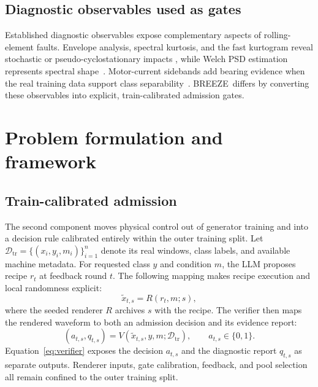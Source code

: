 \documentclass[a4paper,fleqn]{cas-sc}
\newcommand{\breeze}{BREEZE}
\begin{document}
\subsection{Diagnostic observables used as gates}

Established diagnostic observables expose complementary aspects of
rolling-element faults. Envelope analysis, spectral kurtosis, and the fast
kurtogram reveal stochastic or pseudo-cyclostationary impacts
\citep{randall2011bearing,antoni2006spectral,antoni2007kurtogram}, while Welch
PSD estimation represents spectral shape~\citep{welch1967psd}. Motor-current
sidebands add bearing evidence when the real training data support class
separability~\citep{schoen1995mcsa}. \breeze\ differs by converting these
observables into explicit, train-calibrated admission gates.

\section{Problem formulation and framework}
\label{sec:method}

\subsection{Train-calibrated admission}

The second component moves physical control out of generator training and into
a decision rule calibrated entirely within the outer training split. Let
$\mathcal{D}_{\mathrm{tr}}=\{(x_i,y_i,m_i)\}_{i=1}^{n}$ denote its real
windows, class labels, and available machine metadata. For requested class $y$
and condition $m$, the LLM proposes recipe $r_t$ at feedback round $t$. The
following mapping makes recipe execution and local randomness explicit:
\begin{equation}
  \tilde{x}_{t,s}=R(r_t,m;s),
\end{equation}
where the seeded renderer $R$ archives $s$ with the recipe. The verifier then
maps the rendered waveform to both an admission decision and its evidence
report:
\begin{equation}
 (a_{t,s},q_{t,s})=V(\tilde{x}_{t,s},y,m;\mathcal{D}_{\mathrm{tr}}),
 \qquad a_{t,s}\in\{0,1\}.
 \label{eq:verifier}
\end{equation}
Equation~\eqref{eq:verifier} exposes the decision $a_{t,s}$ and the diagnostic
report $q_{t,s}$ as separate outputs. Renderer inputs, gate calibration,
feedback, and pool selection all remain confined to the outer training split.
\end{document}
